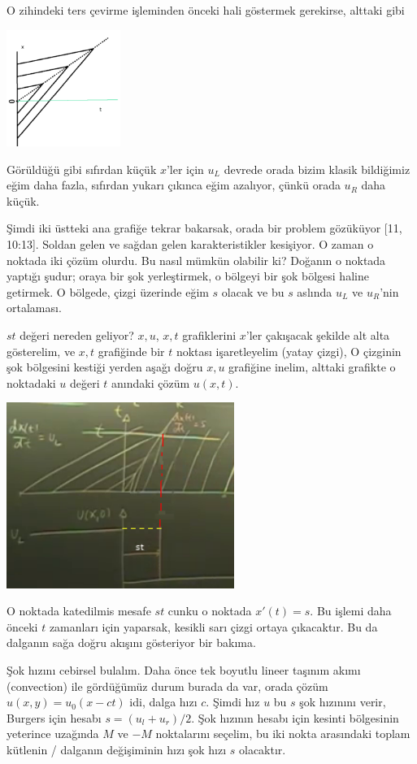 \documentclass[12pt,fleqn]{article}\usepackage{../../common}
\begin{document}
O zihindeki ters çevirme işleminden önceki hali göstermek gerekirse, alttaki gibi

\includegraphics[width=10em]{compscieng_bpp50fv1_04.png}

Görüldüğü gibi sıfırdan küçük $x$'ler için $u_L$ devrede orada bizim klasik
bildiğimiz eğim daha fazla, sıfırdan yukarı çıkınca eğim azalıyor, çünkü
orada $u_R$ daha küçük.

Şimdi iki üstteki ana grafiğe tekrar bakarsak, orada bir problem gözüküyor
[11, 10:13]. Soldan gelen ve sağdan gelen karakteristikler kesişiyor. O zaman
o noktada iki çözüm olurdu. Bu nasıl mümkün olabilir ki? Doğanın o noktada
yaptığı şudur; oraya bir şok yerleştirmek, o bölgeyi bir şok bölgesi haline
getirmek. O bölgede, çizgi üzerinde eğim $s$ olacak ve bu $s$ aslında $u_L$
ve $u_R$'nin ortalaması.

$st$ değeri nereden geliyor? $x,u$, $x,t$ grafiklerini $x$'ler çakışacak şekilde
alt alta gösterelim, ve $x,t$ grafiğinde bir $t$ noktası işaretleyelim (yatay
çizgi), O çizginin şok bölgesini kestiği yerden aşağı doğru $x,u$ grafiğine
inelim, alttaki grafikte o noktadaki $u$ değeri $t$ anındaki çözüm $u(x,t)$.

\includegraphics[width=20em]{compscieng_bpp50fv1_05.png}

O noktada katedilmis mesafe $st$ cunku o noktada $x'(t) = s$. Bu işlemi daha
önceki $t$ zamanları için yaparsak, kesikli sarı çizgi ortaya çıkacaktır. Bu da
dalganın sağa doğru akışını gösteriyor bir bakıma.

Şok hızını cebirsel bulalım. Daha önce tek boyutlu lineer taşınım akımı
(convection) ile gördüğümüz durum burada da var, orada çözüm $u(x,y) =
u_0(x-ct)$ idi, dalga hızı $c$. Şimdi hız $u$ bu $s$ şok hızınını verir, Burgers
için hesabı $s = (u_l + u_r) / 2$.  Şok hızının hesabı için kesinti bölgesinin
yeterince uzağında $M$ ve $-M$ noktalarını seçelim, bu iki nokta arasındaki
toplam kütlenin / dalganın değişiminin hızı şok hızı $s$ olacaktır.
\end{document}
